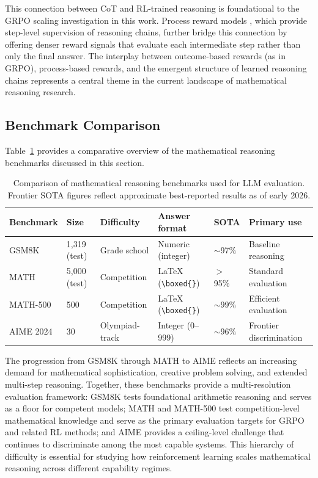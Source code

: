 This connection between CoT and RL-trained reasoning is foundational to the GRPO scaling investigation in this work. Process reward models \cite{lightman2023lets}, which provide step-level supervision of reasoning chains, further bridge this connection by offering denser reward signals that evaluate each intermediate step rather than only the final answer. The interplay between outcome-based rewards (as in GRPO), process-based rewards, and the emergent structure of learned reasoning chains represents a central theme in the current landscape of mathematical reasoning research.

\subsection{Benchmark Comparison}

Table~\ref{tab:math-benchmarks} provides a comparative overview of the mathematical reasoning benchmarks discussed in this section.

\begin{table}[ht]
\centering
\caption{Comparison of mathematical reasoning benchmarks used for LLM evaluation. Frontier SOTA figures reflect approximate best-reported results as of early 2026.}
\label{tab:math-benchmarks}
\footnotesize
\setlength{\tabcolsep}{2pt}
\begin{tabular}{@{}p{}p{}p{}p{}p{}p{}@{}}
\toprule
\textbf{Benchmark} & \textbf{Size} & \textbf{Difficulty} & \textbf{Answer format} & \textbf{SOTA} & \textbf{Primary use} \\
\midrule
GSM8K & 1,319 (test) & Grade school & Numeric (integer) & $\sim$97\% & Baseline reasoning \\
MATH & 5,000 (test) & Competition & \LaTeX{} (\texttt{\textbackslash boxed\{\}}) & $>$95\% & Standard evaluation \\
MATH-500 & 500 & Competition & \LaTeX{} (\texttt{\textbackslash boxed\{\}}) & $\sim$99\% & Efficient evaluation \\
AIME 2024 & 30 & Olympiad-track & Integer (0--999) & $\sim$96\% & Frontier discrimination \\
\bottomrule
\end{tabular}
\end{table}

The progression from GSM8K through MATH to AIME reflects an increasing demand for mathematical sophistication, creative problem solving, and extended multi-step reasoning. Together, these benchmarks provide a multi-resolution evaluation framework: GSM8K tests foundational arithmetic reasoning and serves as a floor for competent models; MATH and MATH-500 test competition-level mathematical knowledge and serve as the primary evaluation targets for GRPO and related RL methods; and AIME provides a ceiling-level challenge that continues to discriminate among the most capable systems. This hierarchy of difficulty is essential for studying how reinforcement learning scales mathematical reasoning across different capability regimes.
